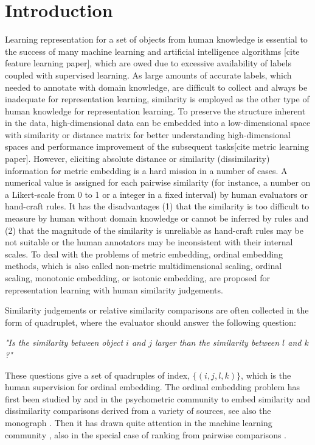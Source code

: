 \documentclass[letterpaper]{article}
\begin{document}
		\section{Introduction}
		Learning representation for a set of objects from human knowledge is essential to the success of many machine learning and artificial intelligence algorithms [cite feature learning paper], which are owed due to excessive availability of labels coupled with supervised learning. As large amounts of accurate labels, which needed to annotate with domain knowledge, are difficult to collect and always be inadequate for representation learning, similarity is employed as the other type of human knowledge for representation learning. To preserve the structure inherent in the data, high-dimensional data can be embedded into a low-dimensional space with similarity or distance matrix for better understanding high-dimensional spaces and performance improvement of the subsequent tasks[cite metric learning paper]. However, eliciting absolute distance or similarity (dissimilarity) information for metric embedding is a hard mission in a number of cases. A numerical value is assigned for each pairwise similarity (for instance, a number on a Likert-scale from 0 to 1 or a integer in a fixed interval) by human evaluators or hand-craft rules. It has the disadvantages (1) that the similarity is too difficult to measure by human without domain knowledge or cannot be inferred by rules and (2) that the magnitude of the similarity is unreliable as hand-craft rules may be not suitable or the human annotators may be inconsistent with their internal scales. To deal with the problems of metric embedding, ordinal embedding methods, which is also called non-metric multidimensional scaling, ordinal scaling, monotonic embedding, or isotonic embedding, are proposed for representation learning with human similarity judgements.

		Similarity judgements or relative similarity comparisons are often collected in the form of quadruplet, where the evaluator should answer the following question:

		\emph{"Is the similarity between object $i$ and $j$ larger than the similarity between $l$ and $k$?"}

		These questions give a set of quadruples of index, $\{(i,j,l,k)\}$, which is the human supervision for ordinal embedding. The ordinal embedding problem has first been studied by \cite{Shepard1962a,Shepard1962b} and \cite{Kruskal1964a,Kruskal1964b} in the psychometric community to embed similarity and dissimilarity comparisons derived from a variety of sources, see also the monograph \cite{Borg05}. Then it has drawn quite attention in the machine learning community \cite{Quist2004DistributionalSA,RosalesSparselinear,agarwal2007generalized,ShawstructPE,McFee:2009:POE:1553374.1553467,jamieson2011low,McFee:2011:LMS:1953048.1953063,tamuz2011adaptiive,vandermaaten2012stochastic,Ailon:2012:ALA:2188385.2188390,Terada2014LocalOE,amid2015multiview,2016arXiv160607081J}, also in the special case of ranking from pairwise comparisons \cite{ouyang2008learning,Mcfee10metriclearning,kevin2011active,NIPS2012_0599,wauthier2013efficient}.
\end{document}
